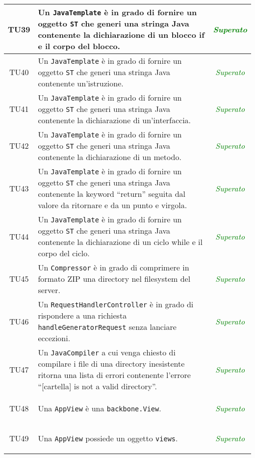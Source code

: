 \begin{longtable}{|c|>{}m{8cm}|c|}
\hypertarget{TU39}{TU39} & Un \texttt{JavaTemplate} è in grado di fornire un oggetto \texttt{ST} che generi una stringa Java contenente la dichiarazione di un blocco if e il corpo del blocco. & \textcolor{Green}{\textit{Superato}}\\ \hline
\hypertarget{TU40}{TU40} & Un \texttt{JavaTemplate} è in grado di fornire un oggetto \texttt{ST} che generi una stringa Java contenente un'istruzione. & \textcolor{Green}{\textit{Superato}}\\ \hline
\hypertarget{TU41}{TU41} & Un \texttt{JavaTemplate} è in grado di fornire un oggetto \texttt{ST} che generi una stringa Java contenente la dichiarazione di un'interfaccia. & \textcolor{Green}{\textit{Superato}}\\ \hline
\hypertarget{TU42}{TU42} & Un \texttt{JavaTemplate} è in grado di fornire un oggetto \texttt{ST} che generi una stringa Java contenente la dichiarazione di un metodo. & \textcolor{Green}{\textit{Superato}}\\ \hline
\hypertarget{TU43}{TU43} & Un \texttt{JavaTemplate} è in grado di fornire un oggetto \texttt{ST} che generi una stringa Java contenente la keyword ``return'' seguita dal valore da ritornare e da un punto e virgola. & \textcolor{Green}{\textit{Superato}}\\ \hline
\hypertarget{TU44}{TU44} & Un \texttt{JavaTemplate} è in grado di fornire un oggetto \texttt{ST} che generi una stringa Java contenente la dichiarazione di un ciclo while e il corpo del ciclo. & \textcolor{Green}{\textit{Superato}}\\ \hline
\hypertarget{TU45}{TU45} & Un \texttt{Compressor} è in grado di comprimere in formato ZIP una directory nel filesystem del server. & \textcolor{Green}{\textit{Superato}}\\ \hline
\hypertarget{TU46}{TU46} & Un \texttt{RequestHandlerController} è in grado di rispondere a una richiesta \texttt{handleGeneratorRequest} senza lanciare eccezioni. & \textcolor{Green}{\textit{Superato}}\\ \hline
\hypertarget{TU47}{TU47} & Un \texttt{JavaCompiler} a cui venga chiesto di compilare i file di una directory inesistente ritorna una lista di errori contenente l'errore ``[cartella] is not a valid directory''. & \textcolor{Green}{\textit{Superato}}\\ \hline
\hypertarget{TU48}{TU48} & Una \texttt{AppView} è una \texttt{backbone.View}. & \textcolor{Green}{\textit{Superato}}\\ \hline
\hypertarget{TU49}{TU49} & Una \texttt{AppView} possiede un oggetto \texttt{views}. & \textcolor{Green}{\textit{Superato}}\\ \hline

\end{longtable}
